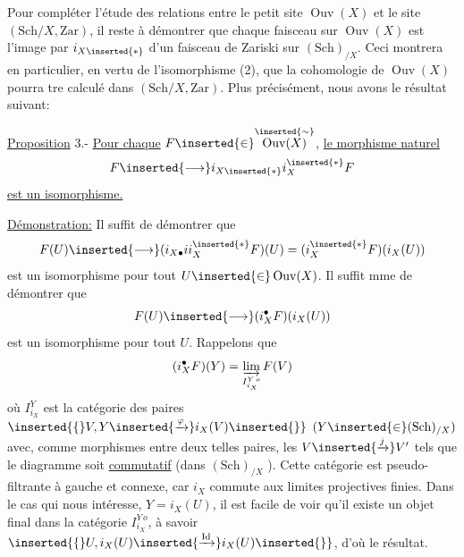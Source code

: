 
Pour compléter l'étude des relations entre le petit site $\operatorname{Ouv}(X)$ et le site $(\mathrm{Sch}/X,\mathrm{Zar})$, il reste à démontrer que chaque faisceau sur $\operatorname{Ouv}(X)$ est l'image par $i_{X\inserted{*}}$ d'un faisceau de Zariski sur $(\mathrm{Sch})_{/X}$. Ceci montrera en particulier, en vertu de l'isomorphisme (2), que la cohomologie de $\operatorname{Ouv}(X)$ pourra tre calculé dans $(\mathrm{Sch}/X,\mathrm{Zar})$. Plus précisément, nous avons le résultat suivant:

\uline{Proposition} 3.- \uline{Pour chaque} $F\inserted{\in}\overset{\inserted{\sim}}{\operatorname{Ouv}(X)}$, \uline{le morphisme naturel}
\[
F\inserted{\longrightarrow}i_{X\inserted{*}}i_X^{\inserted{*}}F
\]
\uline{est un isomorphisme.}

\uline{Démonstration:} Il suffit de démontrer que
\[
F(U)\inserted{\longrightarrow}(i_{X\bullet}ii_X^{\inserted{*}}F)(U)=(i_X^{\inserted{*}}F)(i_X(U))
\]
est un isomorphisme pour tout $U\inserted{\in}\operatorname{Ouv}(X)$. Il suffit mme de démontrer que
\[
F(U)\inserted{\longrightarrow}(i_X^\bullet F)(i_X(U))
\]
est un isomorphisme pour tout $U$. Rappelons que
\[
(i_X^\bullet F)(Y)=\varinjlim_{I_{i_X}^{Y\,o}}F(V)
\]
où $I_{i_X}^{Y}$ est la catégorie des paires $\inserted{\{}V,Y\inserted{\xrightarrow{\varphi}}i_X(V)\inserted{\}}$ $(Y\inserted{\in}(\mathrm{Sch})_{/X})$ avec, comme morphismes entre deux telles paires, les $V\inserted{\xrightarrow{j}}V'$ tels que le diagramme
soit \uline{commutatif} (dans $(\mathrm{Sch})_{/X}$ ). Cette catégorie est pseudo-filtrante à gauche et connexe, car $i_X$ commute aux limites projectives finies. Dans le cas qui nous intéresse, $Y=i_X(U)$, il est facile de voir qu'il existe  un objet final dans la catégorie $I_{i_X}^{Y\,o}$, à savoir $\inserted{\{}U,i_X(U)\inserted{\xrightarrow{\mathrm{Id}}}i_X(U)\inserted{\}}$, d'où le résultat.

